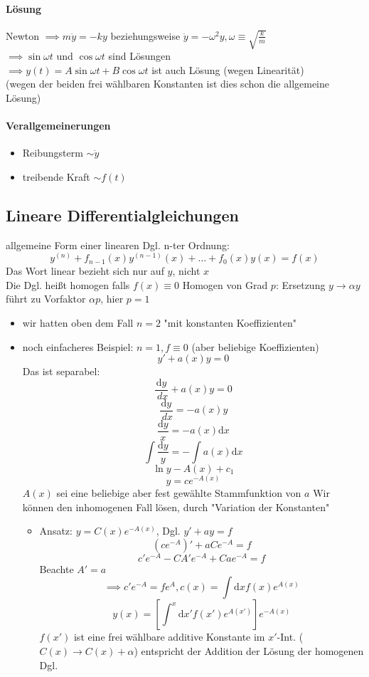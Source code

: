 \documentclass[a4paper]{scrartcl}
\renewcommand{\d}{\mathrm{d}}
\newcommand{\dd}[2]{\frac{\d #1}{\ d#2}}
\theoremstyle{definition}
\theoremstyle{plain}
\theoremstyle{remark}
\theoremstyle{remark}
\begin{document}
\paragraph{Lösung}
\label{sec-3-5-1-2}
Newton $\implies m\ddot{y} = -ky$ beziehungsweise $\ddot{y} = -\omega^2 y,\omega\equiv\sqrt{\frac{k}{m}}$ \\
     $\implies \sin{\omega t}$ und $\cos{\omega t}$ sind Lösungen \\
     $\implies y(t) = A\sin{\omega t} + B\cos{\omega t}$ ist auch Lösung (wegen Linearität) \\
     (wegen der beiden frei wählbaren Konstanten ist dies schon die allgemeine Lösung)
\paragraph{Verallgemeinerungen}
\label{sec-3-5-1-3}
\begin{itemize}
\item Reibungsterm $\sim \dot{y}$
\item treibende Kraft $\sim f(t)$
\end{itemize}
\subsection{Lineare Differentialgleichungen}
\label{sec-3-6}
allgemeine Form einer linearen Dgl. n-ter Ordnung:
\[y^{(n)} + f_{n -1}(x)y^{(n - 1)}(x) + \ldots + f_0(x)y(x) = f(x)\]
Das Wort linear bezieht sich nur auf $y$, nicht $x$ \\
   Die Dgl. heißt homogen falls $f(x)\equiv 0$
Homogen von Grad $p$: Ersetzung $y\to\alpha y$ führt zu Vorfaktor $\alpha p$, hier $p = 1$
\begin{itemize}
\item wir hatten oben dem Fall $n = 2$ "mit konstanten Koeffizienten"
\item noch einfacheres Beispiel: $n = 1, f\equiv 0$ (aber beliebige Koeffizienten)
\[y' + a(x)y = 0\]
Das ist separabel:
\[\dd{y}{x} + a(x) y = 0\]
\[\dd{y}{x} = -a(x) y\]
\[\frac{\d y}{x} = -a(x) \d x\]
\[\int\frac{\d y}{y} = - \int a(x)\d x\]
\[\ln{y} - A(x) + c_1\]
\[y = c e^{-A(x)}\]
$A(x)$ sei eine beliebige aber fest gewählte Stammfunktion von $a$
Wir können den inhomogenen Fall lösen, durch "Variation der Konstanten"
\begin{itemize}
\item Ansatz: $y = C(x)e^{-A(x)}$, Dgl. $y' + ay = f$
       \[(c e^{-A})' + a C e^{-A} = f\]
       \[c' e^{-A} - C A' e^{-A} + C a e^{-A} = f\]
       Beachte $A' = a$
       \[\implies c'e^{-A} = f e^{A},c(x) = \int\d x f(x) e^{A(x)}\]
       \[y(x) = \left[\int^x\d x' f(x') e^{A(x')}\right] e^{-A(x)}\]
       $f(x')$ ist eine frei wählbare additive Konstante im $x'$-Int. ($C(x)\to C(x) +\alpha$) entspricht der Addition der Lösung der homogenen Dgl.
\end{itemize}
\end{itemize}
\end{document}
